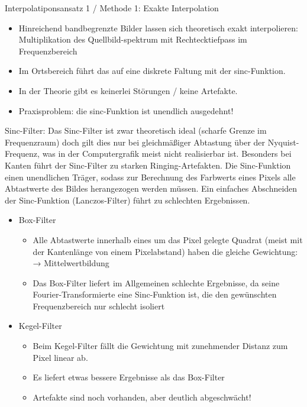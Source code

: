 \documentclass[10pt,landscape]{article}
\begin{document}
\begin{multicols}{3}
Interpolatiponsansatz 1 / Methode 1: Exakte Interpolation
\begin{itemize}
  \item Hinreichend bandbegrenzte Bilder lassen sich theoretisch exakt interpolieren: Multiplikation des Quellbild-spektrum mit Rechtecktiefpass im Frequenzbereich
  \item Im Ortsbereich führt das auf eine diskrete Faltung mit der sinc-Funktion.
  \item In der Theorie gibt es keinerlei Störungen / keine Artefakte.
  \item Praxisproblem: die sinc-Funktion ist unendlich ausgedehnt!
\end{itemize}

Sinc-Filter: Das Sinc-Filter ist zwar theoretisch ideal (scharfe Grenze im Frequenzraum) doch gilt dies nur bei gleichmäßiger Abtastung über der Nyquist-Frequenz, was in der Computergrafik meist nicht realisierbar ist. Besonders bei Kanten führt der Sinc-Filter zu starken Ringing-Artefakten. 
Die Sinc-Funktion einen unendlichen Träger, sodass zur Berechnung des Farbwerts eines Pixels alle Abtastwerte des Bildes herangezogen werden müssen. Ein einfaches Abschneiden der Sinc-Funktion (Lanczos-Filter) führt zu schlechten Ergebnissen.

\begin{itemize}
  \item Box-Filter
        \begin{itemize}
          \item Alle Abtastwerte innerhalb eines um das Pixel gelegte Quadrat (meist mit der Kantenlänge von einem Pixelabstand) haben die gleiche Gewichtung: → Mittelwertbildung
          \item Das Box-Filter liefert im Allgemeinen schlechte Ergebnisse, da seine Fourier-Transformierte eine Sinc-Funktion ist, die den gewünschten Frequenzbereich nur schlecht isoliert
        \end{itemize}
        
  \item Kegel-Filter
        \begin{itemize}
          \item Beim Kegel-Filter fällt die Gewichtung mit zunehmender Distanz zum Pixel linear ab.
          \item Es liefert etwas bessere Ergebnisse als das Box-Filter
          \item Artefakte sind noch vorhanden, aber deutlich abgeschwächt!
        \end{itemize}
        

\end{itemize}
\end{multicols}
\end{document}
